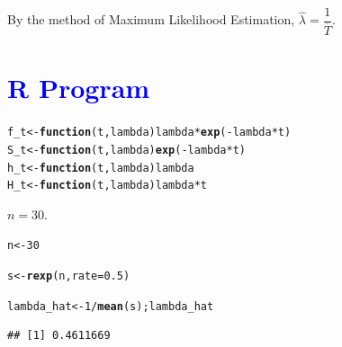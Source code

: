 \documentclass[11pt, a4paper]{article}\usepackage[]{graphicx}\usepackage[]{xcolor}
\makeatletter
\newcommand{\hlnum}[1]{\textcolor[rgb]{0.686,0.059,0.569}{#1}}%
\newcommand{\hlopt}[1]{\textcolor[rgb]{0,0,0}{#1}}%
\newcommand{\hldef}[1]{\textcolor[rgb]{0.345,0.345,0.345}{#1}}%
\newcommand{\hlkwa}[1]{\textcolor[rgb]{0.161,0.373,0.58}{\textbf{#1}}}%
\newcommand{\hlkwb}[1]{\textcolor[rgb]{0.69,0.353,0.396}{#1}}%
\newcommand{\hlkwc}[1]{\textcolor[rgb]{0.333,0.667,0.333}{#1}}%
\newcommand{\hlkwd}[1]{\textcolor[rgb]{0.737,0.353,0.396}{\textbf{#1}}}%
\newenvironment{kframe}{%
 \def\at@end@of@kframe{}%
 \ifinner\ifhmode%
  \def\at@end@of@kframe{\end{minipage}}%
  \begin{minipage}{\columnwidth}%
 \fi\fi%
 \def\FrameCommand##1{\hskip\@totalleftmargin \hskip-\fboxsep
 \colorbox{shadecolor}{##1}\hskip-\fboxsep
     \hskip-\linewidth \hskip-\@totalleftmargin \hskip\columnwidth}%
 \MakeFramed {\advance\hsize-\width
   \@totalleftmargin\z@ \linewidth\hsize
   \@setminipage}}%
 {\par\unskip\endMakeFramed%
 \at@end@of@kframe}
\newenvironment{knitrout}{}{} %
\makeatother
\begin{document}
By the method of Maximum Likelihood Estimation, $\hat{\lambda} = \dfrac{1}{\overline{T}}$.

\section*{\faArrowAltCircleRight[regular] \textcolor{blue}{R Program}}

\begin{knitrout}
\color{fgcolor}\begin{kframe}
\begin{alltt}
\hldef{f_t} \hlkwb{<-} \hlkwa{function}\hldef{(}\hlkwc{t}\hldef{,} \hlkwc{lambda}\hldef{) lambda} \hlopt{*} \hlkwd{exp}\hldef{(}\hlopt{-}\hldef{lambda} \hlopt{*} \hldef{t)}
\hldef{S_t} \hlkwb{<-} \hlkwa{function}\hldef{(}\hlkwc{t}\hldef{,} \hlkwc{lambda}\hldef{)} \hlkwd{exp}\hldef{(}\hlopt{-}\hldef{lambda} \hlopt{*} \hldef{t)}
\hldef{h_t} \hlkwb{<-} \hlkwa{function}\hldef{(}\hlkwc{t}\hldef{,} \hlkwc{lambda}\hldef{) lambda}
\hldef{H_t} \hlkwb{<-} \hlkwa{function}\hldef{(}\hlkwc{t}\hldef{,} \hlkwc{lambda}\hldef{) lambda} \hlopt{*} \hldef{t}
\end{alltt}
\end{kframe}
\end{knitrout}

\newpage




 $n = 30$.

\begin{knitrout}
\color{fgcolor}\begin{kframe}
\begin{alltt}
\hldef{n} \hlkwb{<-} \hlnum{30}
\end{alltt}
\end{kframe}
\end{knitrout}

\begin{knitrout}
\color{fgcolor}\begin{kframe}
\begin{alltt}
\hldef{s} \hlkwb{<-} \hlkwd{rexp}\hldef{(n,} \hlkwc{rate} \hldef{=} \hlnum{0.5}\hldef{)}
\end{alltt}
\end{kframe}
\end{knitrout}

\begin{knitrout}
\color{fgcolor}\begin{kframe}
\begin{alltt}
\hldef{lambda_hat} \hlkwb{<-} \hlnum{1} \hlopt{/} \hlkwd{mean}\hldef{(s); lambda_hat}
\end{alltt}
\begin{verbatim}
## [1] 0.4611669
\end{verbatim}
\end{kframe}
\end{knitrout}
\end{document}
